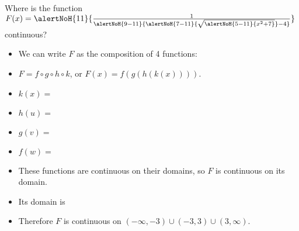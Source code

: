 \begin{frame}
\begin{example}%
Where is the function $F(x) = \alertNoH{11}{\frac{1}{\alertNoH{9-11}{\alertNoH{7-11}{\sqrt{\alertNoH{5-11}{x^2+7}}} - 4}}}$ continuous?
\begin{itemize}
\item<2->  We can write $F$ as the composition of 4 functions:
\item<2->  $F = f\circ g\circ h\circ k$, or $F(x) = f(g(h(k(x))))$.
\item<3-| alert@4-5>  $k(x) = $ 
\item<3-| alert@6-7>  $h(u) = $ 
\item<3-| alert@8-9>  $g(v) = $ 
\item<3-| alert@10-11>  $f(w) = $ 
\item<12->  These functions are continuous on their domains, so $F$ is continuous on its domain.
\item<13->  Its domain is 
\item<15->  Therefore $F$ is continuous on $(-\infty , -3 ) \cup (-3, 3) \cup (3, \infty )$.
\end{itemize}
\end{example}
\end{frame}

